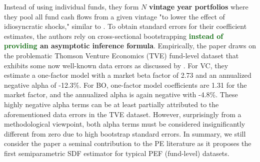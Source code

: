 Instead of using individual funds, they form $N$ \textbf{vintage year portfolios} where they pool all fund cash flows from a given vintage "to lower the effect of idiosyncratic shocks," similar to \cite{FNP12}.
To obtain standard errors for their coefficient estimates, the authors rely on cross-sectional bootstrapping \textbf{\textcolor{darkgreen}{instead of providing} an asymptotic inference formula}.
Empirically, the paper draws on the problematic Thomson Venture Economics (TVE) fund-level dataset that exhibits some now well-known data errors as discussed by \cite{HJK14}.
For VC, they estimate a one-factor model with a market beta factor of 2.73 and an annualized negative alpha of -12.3\%. For BO, one-factor model coefficients are 1.31 for the market factor, and the annualized alpha is again negative with -4.8\%.
These highly negative alpha terms can be at least partially attributed to the aforementioned data errors in the TVE dataset.
However, surprisingly from a methodological viewpoint, both alpha terms must be considered insignificantly different from zero due to high bootstrap standard errors.
In summary, we still consider the \cite{DLP12} paper a seminal contribution to the PE literature as it proposes the first semiparametric SDF estimator for typical PEF (fund-level) datasets.  


